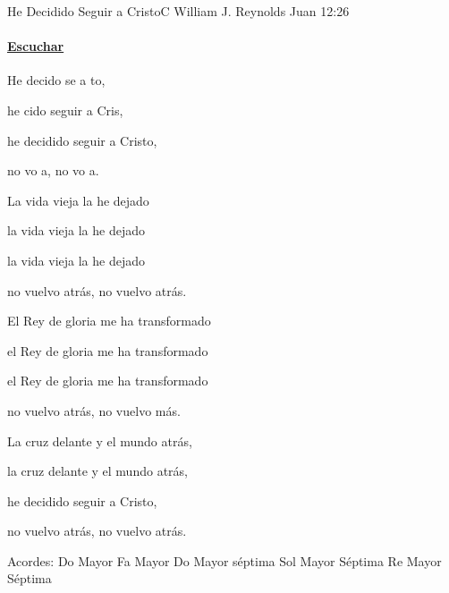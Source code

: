 \documentclass[12pt, spanish]{book}
\begin{document}
    \begin{song}{He Decidido Seguir a Cristo}{C}
        {} %
        {William J. Reynolds}
        {Juan 12:26} %
        {}
        \ifChordBk
        \paragraph{\mbox{}\hfill\protect\href{https://open.spotify.com/intl-es/track/7AFZgROuKik53o560tuwwq}{Escuchar}\mbox{}\hfill}
        \fi

        \begin{SBChorus}
            He decido se a to,

            he cido seguir a Cris,

            he decidido seguir a Cristo,

            no vo a, no vo a.
        \end{SBChorus}

        \begin{SBOpGroup}
            La vida vieja la he dejado

            la vida vieja la he dejado

            la vida vieja la he dejado

            no vuelvo atrás, no vuelvo atrás.
        \end{SBOpGroup}

        \begin{SBOpGroup}
            El Rey de gloria me ha transformado

            el Rey de gloria me ha transformado

            el Rey de gloria me ha transformado

            no vuelvo atrás, no vuelvo más.
        \end{SBOpGroup}

        \begin{SBOpGroup}
            La cruz delante y el mundo atrás,

            la cruz delante y el mundo atrás,

            he decidido seguir a Cristo,

            no vuelvo atrás, no vuelvo atrás.
        \end{SBOpGroup}

        \ifChordBk
        \begin{SBOpGroup}
            Acordes:
            \upchord{\C}\qquad Do Mayor \hfill
            \upchord{\F}\qquad Fa Mayor \hfill\null\break
            \upchord{\Cseven}\qquad Do Mayor s\'eptima \hfill
            \upchord{\Gseven}Sol Mayor S\'eptima \hfill\null\break
            \upchord{\Dseven}\qquad Re Mayor S\'eptima \hfill
        \end{SBOpGroup}
        \fi
    \end{song}
\end{document}
